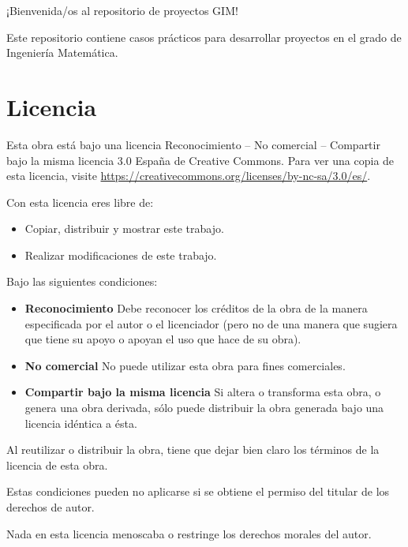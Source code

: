 \documentclass[
  a4paper,
]{scrreport}
\providecommand{\tightlist}{%
  \setlength{\itemsep}{0pt}\setlength{\parskip}{0pt}}\usepackage{longtable,booktabs,array}
\begin{document}

¡Bienvenida/os al repositorio de proyectos GIM!

Este repositorio contiene casos prácticos para desarrollar proyectos en
el grado de Ingeniería Matemática.

\hypertarget{licencia}{%
\section*{Licencia}\label{licencia}}


Esta obra está bajo una licencia Reconocimiento -- No comercial --
Compartir bajo la misma licencia 3.0 España de Creative Commons. Para
ver una copia de esta licencia, visite
\url{https://creativecommons.org/licenses/by-nc-sa/3.0/es/}.

Con esta licencia eres libre de:

\begin{itemize}
\tightlist
\item
  Copiar, distribuir y mostrar este trabajo.
\item
  Realizar modificaciones de este trabajo.
\end{itemize}

Bajo las siguientes condiciones:

\begin{itemize}
\item
  \textbf{Reconocimiento} Debe reconocer los créditos de la obra de la
  manera especificada por el autor o el licenciador (pero no de una
  manera que sugiera que tiene su apoyo o apoyan el uso que hace de su
  obra).
\item
  \textbf{No comercial} No puede utilizar esta obra para fines
  comerciales.
\item
  \textbf{Compartir bajo la misma licencia} Si altera o transforma esta
  obra, o genera una obra derivada, sólo puede distribuir la obra
  generada bajo una licencia idéntica a ésta.
\end{itemize}

Al reutilizar o distribuir la obra, tiene que dejar bien claro los
términos de la licencia de esta obra.

Estas condiciones pueden no aplicarse si se obtiene el permiso del
titular de los derechos de autor.

Nada en esta licencia menoscaba o restringe los derechos morales del
autor.
\end{document}
